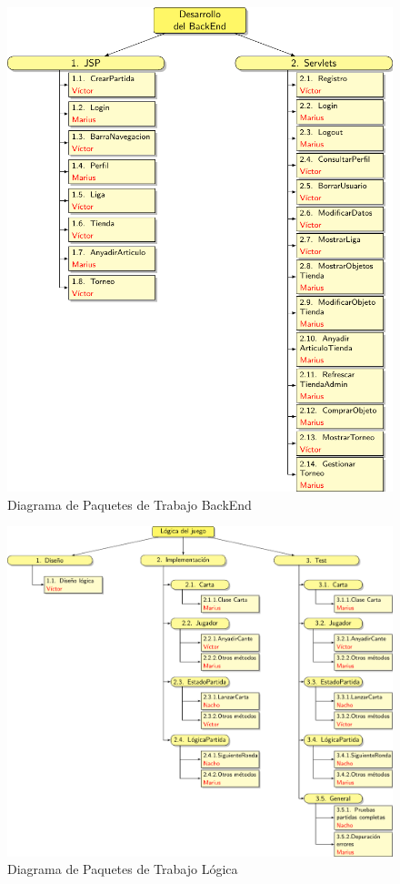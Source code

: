 \begin{figure}[H]
		\centering
		\includegraphics[scale=0.8]{figuras/edtBackend.pdf}
		\caption{Diagrama de Paquetes de Trabajo BackEnd}
	\end{figure}

\begin{figure}[H]
		\hspace{-1cm}
		\includegraphics[scale=0.8]{figuras/edtLogica.pdf}
		\caption{Diagrama de Paquetes de Trabajo Lógica}
	\end{figure}

